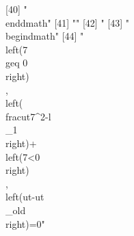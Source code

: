  [40] "\\end{dmath}"                                                                                                                                                                                                                                                                                                                                                                                                                                                                                
 [41] ""                                                                                                                                                                                                                                                                                                                                                                                                                                                                                            
 [42] "%
 [43] "\\begin{dmath}"                                                                                                                                                                                                                                                                                                                                                                                                                                                                              
 [44] "\\left(7\\geq 0\\right)\\, \\left(\\frac{{ut}}{7^{2}}-{{l\\_1}}\\right)+\\left(7<0\\right)\\, \\left({ut}-{{ut\\_old}}\\right)=0"                                                                                                                                                                                                                                                                                                                                                            
